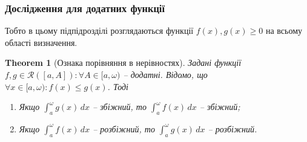 \documentclass[a4paper, 10pt]{article}
\def\huge{\displaystyle}
\theoremstyle{theoremdd}
\newtheorem{theorem}{Theorem}[subsection]
\theoremstyle{theoremdd}
\theoremstyle{theoremdd}
\theoremstyle{theoremdd}
\theoremstyle{theoremdd}
\theoremstyle{theoremdd}
\theoremstyle{theoremdd}
\theoremstyle{theoremdd}
\theoremstyle{theoremdd}
\begin{document}
\subsubsection{Дослідження для додатних функції}
Тобто в цьому підпідрозділі розглядаються функції $f(x), g(x) \geq 0$ на всьому області визначення.
\begin{theorem}[Ознака порівняння в нерівностях]
Задані функції $f,g \in \mathcal{R}([a,A]): \forall A \in [a,\omega)$ -- додатні. Відомо, що $\forall x \in [a,\omega): f(x) \leq g(x)$. Тоді
\begin{enumerate}[nosep,wide=0pt,label={\arabic*)}]
\item Якщо $\huge\int_a^\omega g(x)\,dx$ -- збіжний, то $\huge\int_a^\omega f(x)\,dx$ -- збіжний;
\item Якщо $\huge\int_a^\omega f(x)\,dx$ -- розбіжний, то $\huge\int_a^\omega g(x)\,dx$ -- розбіжний.
\end{enumerate}
\iffalse %
\begin{figure}[H]
\centering
\begin{tikzpicture}[scale = 1.5]
\draw[name path = A, thick] (1.2,0)--(4,0);
\draw[thick] (0.5,0)--(1.2,0);
\draw[thick, ->] (4,0)--(5,0) node[anchor=north west] {$x$};
\draw[thick, name path = C, domain=1.2:4, variable=\x, samples = 1000] plot({\x}, {2/(\x*\x)}) node[anchor = south] {$g(x)$};
\draw[thick, name path = D, domain=1.2:4, variable=\x, samples = 1000] plot({\x}, {2/(\x*\x*\x)}) node [anchor = west] {$f(x)$};
\draw[dashed] (1.2,0)--(1.2,{2/(1.2*1.2)});
\draw[name path = B, dashed] (4,0)--(4,{2/(4*4)});
\tikzfillbetween[of=A and C]{blue, opacity = 0.3};
\tikzfillbetween[of=A and D]{red, opacity = 0.3};
\node at (1.2,-0.25) {$a$};
\end{tikzpicture}
\caption*{Якщо площа більшої функції скінченна, то площа меншої функції тим паче скінченна.}
\end{figure}
\fi %
\end{theorem}
\end{document}
